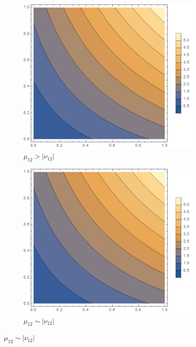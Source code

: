 \documentclass[12pt,a4]{article}
\begin{document}
\begin{figure}[!ht]
	\begin{subfigure}[b]{0.3\textwidth}
		\centering
		\includegraphics[width=\textwidth]{Joonised/ThetaMu11Mu22I}
		\caption{$ \mu_{12} > |\nu_{12}| $}
	\end{subfigure}
	\hfill
	\begin{subfigure}[b]{0.3\textwidth}
		\centering
		\includegraphics[width=\textwidth]{Joonised/ThetaMu11Mu22II}
		\caption{$ \mu_{12} \sim | \nu_{12}| $}

\end{subfigure}
\end{figure}
\end{document}

